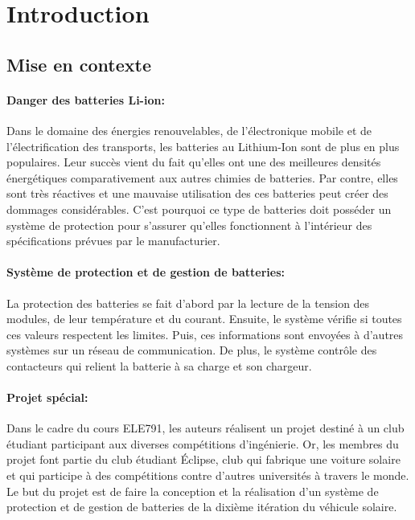 \section{Introduction}

	\subsection{Mise en contexte}
		\paragraph*{Danger des batteries Li-ion:}
		Dans le domaine des énergies renouvelables, de l'électronique mobile et de l'électrification des transports, les batteries au Lithium-Ion sont de plus en plus populaires. Leur succès vient du fait qu'elles ont une des meilleures densités énergétiques comparativement aux autres chimies de batteries. Par contre, elles sont très réactives et une mauvaise utilisation des ces batteries peut créer des dommages considérables. C'est pourquoi ce type de batteries doit posséder un système de protection pour s'assurer qu'elles fonctionnent à l'intérieur des spécifications prévues par le manufacturier.
		
		\paragraph*{Système de protection et de gestion de batteries:}
		La protection des batteries se fait d'abord par la lecture de la tension des modules, de leur température et du courant. Ensuite, le système vérifie si toutes ces valeurs respectent les limites. Puis, ces informations sont envoyées à d'autres systèmes sur un réseau de communication. De plus, le système contrôle des contacteurs qui relient la batterie à sa charge et son chargeur.
		
		\paragraph*{Projet spécial:}		
		Dans le cadre du cours ELE791, les auteurs réalisent un projet destiné à un club étudiant participant aux diverses compétitions d'ingénierie. Or, les membres du projet font partie du club étudiant Éclipse, club qui fabrique une voiture solaire et qui participe à des compétitions contre d'autres universités à travers le monde. Le but du projet est de faire la conception et la réalisation d'un système de protection et de gestion de batteries de la dixième itération du véhicule solaire. 
		
